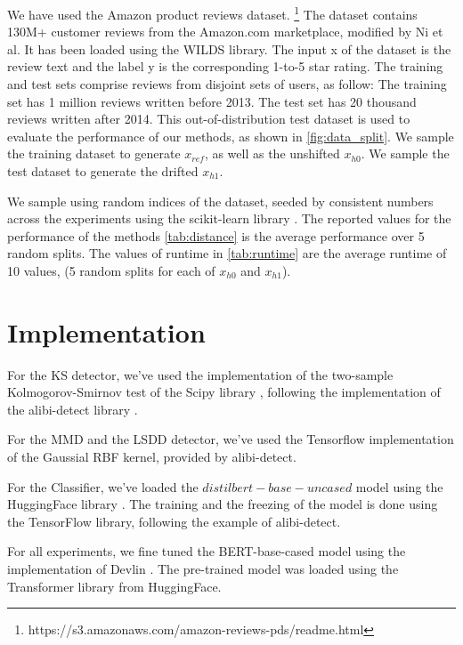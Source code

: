 \documentclass[12pt]{report}
\begin{document}
We have used the Amazon product reviews dataset. \footnote{https://s3.amazonaws.com/amazon-reviews-pds/readme.html}
The dataset contains 130M+ customer reviews from the Amazon.com marketplace, modified by Ni et al. \cite{niJustifyingRecommendationsUsing2019}
It has been loaded using the WILDS \cite{kohWILDSBenchmarkIntheWild2020} library.
The input x of the dataset is the review text and the label y is the corresponding 1-to-5 star rating.
The training and test sets comprise reviews from disjoint sets of users, as follow:
The training set has 1 million reviews written before 2013.
The test set has 20 thousand reviews written after 2014.
This out-of-distribution test dataset is used to evaluate the performance of our methods, as shown in \ref{fig:data_split}.
We sample the training dataset to generate \(x_{ref}\), as well as the unshifted \(x_{h0}\).
We sample the test dataset to generate the drifted \(x_{h1}\).

We sample using random indices of the dataset, seeded by consistent numbers across the experiments using the scikit-learn library \cite{JMLR:v12:pedregosa11a}.
The reported values for the performance of the methods \ref{tab:distance} is the average performance over 5 random splits.
The values of runtime in \ref{tab:runtime} are the average runtime of 10 values, (5 random splits for each of \(x_{h0}\) and \(x_{h1}\)).

\section{Implementation}

For the KS detector, we've used the implementation of the two-sample Kolmogorov-Smirnov test of the Scipy library \cite{ScipyStatsKs}, following the implementation of the alibi-detect library \cite{vanlooverenAlibiDetectAlgorithms2022}.

For the MMD and the LSDD detector, we've used the Tensorflow \cite{developersTensorFlow2022} implementation of the Gaussial RBF kernel, provided by alibi-detect.

For the Classifier, we've loaded the \(distilbert-base-uncased\) model using the HuggingFace library \cite{DistilbertbaseuncasedHuggingFace}.
The training and the freezing of the model is done using the TensorFlow library, following the example of alibi-detect.

For all experiments, we fine tuned the BERT-base-cased model using the implementation of Devlin \cite{devlinBERTPretrainingDeep2019}.
The pre-trained model was loaded using the Transformer library from HuggingFace.
\end{document}
